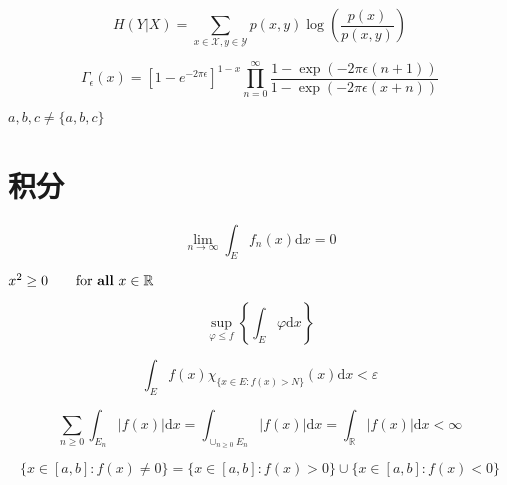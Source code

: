 \documentclass{article}
\begin{document}
    \[
    H(Y | X)=\sum_{x \in \mathcal{X}, y \in \mathcal{Y}} p(x, y) \log \left(\frac{p(x)}{p(x, y)}\right)
    \]

    \[
    \Gamma_{\epsilon}(x)=\left[1-e^{-2 \pi \epsilon}\right]^{1-x} \prod_{n=0}^{\infty} \frac{1-\exp (-2 \pi \epsilon(n+1))}{1-\exp (-2 \pi \epsilon(x+n))}
    \]

    ${a,b,c}\neq \{a,b,c\}$ %

\section{积分}
    \[
    \lim _{n \rightarrow \infty} \int_{E} f_{n}(x) \mathrm{d} x=0
    \]

    $x^{2} \geq 0 \qquad
    \text{for \textbf{all} }
    x\in\mathbb{R}$

    \[
    \sup _{\varphi \leq f}\left\{\int_{E} \varphi \mathrm{d} x\right\}
    \]

    \[
    \int_{E} f(x) \chi_{\{x \in E: f(x)>N\}}(x) \mathrm{d} x<\varepsilon
    \]

    \[
    \sum_{n \geq 0} \int_{E_{n}}|f(x)| \mathrm{d} x=\int_{\cup_{n \geq 0} E_{n}}|f(x)| \mathrm{d} x=\int_{\mathbb{R}}|f(x)| \mathrm{d} x<\infty
    \]
    
    \[
    \{x \in[a, b]: f(x) \neq 0\}=\{x \in[a, b]: f(x)>0\} \cup\{x \in[a, b]: f(x)<0\}
    \]
\end{document}
